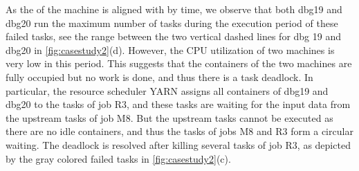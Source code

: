 As the  of the machine is aligned with  by time, 
we observe that both dbg19 and dbg20 run the maximum number of tasks during the execution period of these failed tasks, see the range between the two vertical dashed lines for dbg 19 and dbg20 in \autoref{fig:casestudy2}(d). 
However, the CPU utilization of two machines is very low in this period. 
This suggests that the containers of the two machines are fully occupied but no work is done, and thus there is a task deadlock.
In particular, the resource scheduler YARN assigns all containers of dbg19 and dbg20 to the tasks of job R3, and these tasks are waiting for the input data from the upstream tasks of job M8. But the upstream tasks cannot be executed as there are no idle containers, and thus the tasks of jobs M8 and R3 form a circular waiting.
The deadlock is resolved after killing several tasks of job R3, as depicted by the gray colored failed tasks in \autoref{fig:casestudy2}(c).

